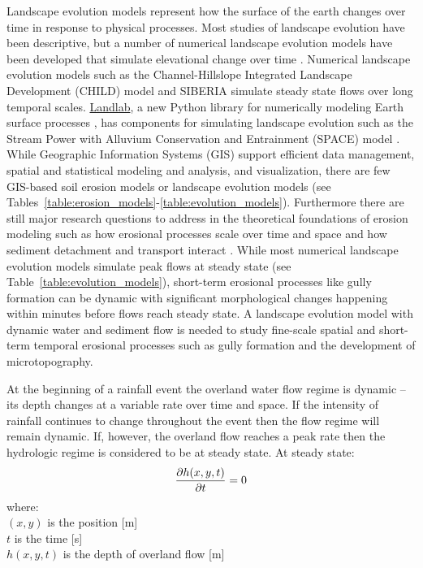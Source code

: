 \documentclass[gmd, manuscript]{copernicus}
\begin{document}
\introduction
Landscape evolution models represent how the surface of the earth changes 
over time in response to physical processes. 
Most studies of landscape evolution have been descriptive, 
but a number of numerical landscape evolution models 
have been developed that simulate elevational change over time 
\citep{Temme2013}. 
Numerical landscape evolution models
such as the Channel-Hillslope Integrated Landscape Development (CHILD) model 
\citep{Tucker2001} 
and SIBERIA \citep{Willgoose2005}
simulate steady state flows over long temporal scales. 
\href{http://landlab.github.io/}{Landlab},
a new Python library for numerically modeling Earth surface processes
\citep{Hobley2017},
has components for simulating landscape evolution such as the 
Stream Power with Alluvium Conservation and Entrainment (SPACE) 
model \citep{Shobe2017}.
While Geographic Information Systems (GIS)
support efficient data management, 
spatial and statistical modeling and analysis, 
and visualization,
there are few GIS-based soil erosion models or landscape evolution models
(see Tables~\ref{table:erosion_models}-\ref{table:evolution_models}).
Furthermore there are still major research questions 
to address in the theoretical foundations of erosion modeling 
such as how erosional processes scale over time and space 
and how sediment detachment and transport interact \citep{Mitasova2013}. 
While most numerical landscape evolution models 
simulate peak flows at steady state
(see Table~\ref{table:evolution_models}),
short-term erosional processes like gully formation can be dynamic
with significant morphological changes happening within minutes
before flows reach steady state. 
A landscape evolution model with dynamic water and sediment flow
is needed to study fine-scale spatial and short-term temporal erosional processes
such as gully formation and the development of microtopography. 

At the beginning of a rainfall event 
the overland water flow regime is dynamic -- 
its depth changes at a variable rate over time and space. 
If the intensity of rainfall continues to change throughout the event
then the flow regime will remain dynamic. 
If, however, the overland flow reaches a peak rate
then the hydrologic regime is considered to be at steady state.
At steady state:
\begin{equation}
\label{eq:steady_state}
{\partial h(x,y,t) \over \partial t} = 0
\end{equation}
%
{\small
\noindent
where: \\
\noindent
\hspace*{0.5em} $(x,y)$ is the position [\unit{m}]\\
\hspace*{0.5em} $t$ is the time [\unit{s}]\\
\hspace*{0.5em} $h(x,y,t)$ is the depth of overland flow [\unit{m}]\\
}
\end{document}
